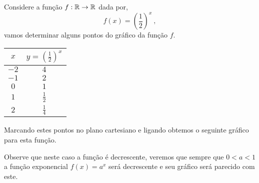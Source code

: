   \begin{exem}\label{ex:exp-1/2}
  Considere a função $f: \mathbb{R} \rightarrow \mathbb{R}$ dada por,
\begin{equation*}
f(x) = \left(\dfrac{1}{2}\right)^x \ , 
\end{equation*}
  vamos determinar alguns pontos do gráfico da função $f$.

  \begin{table}[H]
  \centering
  \begin{tabular}{|c|c|} \hline
  \rowcolor{gray}
  $x$ &  $y=(\frac{1}{2})^x$ \\ \hline
  $-2$ & $4$ \\ \hline
  $-1$ &  $2$ \\ \hline
  $0$ &  $1$ \\ \hline
  $1$ &  $\frac{1}{2}$ \\ \hline
  $2$ &  $\frac{1}{4}$ \\ \hline
  \end{tabular}
  \end{table}

  Marcando estes pontos no plano cartesiano e ligando obtemos o seguinte gráfico para esta função.

  \begin{center}
    \end{center}

  Observe que neste caso a função é decrescente, veremos que sempre que $0< a < 1$ a função exponencial $f(x)=a^x$ será decrescente e seu gráfico será parecido com este.
 \end{exem}


